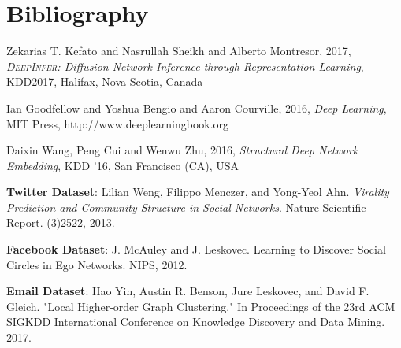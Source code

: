 \documentclass{article}
\begin{document}
			
			\newpage
			
	\section{Bibliography}
	\begin{thebibliography}{10}	
		
		Zekarias T. Kefato and Nasrullah Sheikh and Alberto Montresor, 2017, \textit{\textsc{DeepInfer}: Diffusion Network Inference through Representation Learning}, KDD2017, Halifax, Nova Scotia, Canada
		
		Ian Goodfellow and Yoshua Bengio and Aaron Courville, 2016, \textit{Deep Learning}, MIT Press, http://www.deeplearningbook.org
		
		Daixin Wang, Peng Cui and Wenwu Zhu, 2016, \textit{Structural Deep Network Embedding}, KDD ’16, San Francisco (CA), USA
		
		\textbf{Twitter Dataset}: Lilian Weng, Filippo Menczer, and Yong-Yeol Ahn. \textit{Virality Prediction and Community Structure in Social Networks}. Nature Scientific Report. (3)2522, 2013.
		
		\textbf{Facebook Dataset}: J. McAuley and J. Leskovec. Learning to Discover Social Circles in Ego Networks. NIPS, 2012.
		
		\textbf{Email Dataset}: Hao Yin, Austin R. Benson, Jure Leskovec, and David F. Gleich. "Local Higher-order Graph Clustering." In Proceedings of the 23rd ACM SIGKDD International Conference on Knowledge Discovery and Data Mining. 2017.
		
		
	\end{thebibliography}
			
\end{document}
